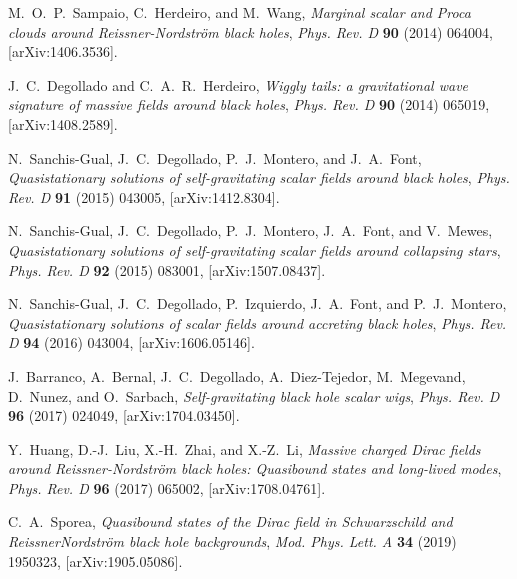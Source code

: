 \begin{thebibliography}{99}
M.~O.~P.~Sampaio, C.~Herdeiro, and M.~Wang,
\emph{Marginal scalar and Proca clouds around Reissner-Nordstr\"om black holes},
{\emph{Phys. Rev. D} {\bfseries 90} (2014) 064004},
[{{\ttfamily arXiv:1406.3536}}].

J.~C.~Degollado and C.~A.~R.~Herdeiro,
\emph{Wiggly tails: a gravitational wave signature of massive fields around black holes},
{\emph{Phys. Rev. D} {\bfseries 90} (2014) 065019},
[{{\ttfamily arXiv:1408.2589}}].


N.~Sanchis-Gual, J.~C.~Degollado, P.~J.~Montero, and J.~A.~Font,
\emph{Quasistationary solutions of self-gravitating scalar fields around black holes},
{\emph{Phys. Rev. D} {\bfseries 91} (2015) 043005},
[{{\ttfamily arXiv:1412.8304}}].

N.~Sanchis-Gual, J.~C.~Degollado, P.~J.~Montero, J.~A.~Font, and V.~Mewes,
\emph{Quasistationary solutions of self-gravitating scalar fields around collapsing stars},
{\emph{Phys. Rev. D} {\bfseries 92} (2015) 083001},
[{{\ttfamily arXiv:1507.08437}}].


N.~Sanchis-Gual, J.~C.~Degollado, P.~Izquierdo, J.~A.~Font, and P.~J.~Montero,
\emph{Quasistationary solutions of scalar fields around accreting black holes},
{\emph{Phys. Rev. D} {\bfseries 94} (2016) 043004},
[{{\ttfamily arXiv:1606.05146}}].

J.~Barranco, A.~Bernal, J.~C.~Degollado, A.~Diez-Tejedor, M.~Megevand, D.~Nunez, and O.~Sarbach,
\emph{Self-gravitating black hole scalar wigs},
{\emph{Phys. Rev. D} {\bfseries 96} (2017) 024049},
[{{\ttfamily arXiv:1704.03450}}].

Y.~Huang, D.-J.~Liu, X.-H.~Zhai, and X.-Z.~Li,
\emph{Massive charged Dirac fields around Reissner-Nordstr\"om black holes: Quasibound states and long-lived modes},
{\emph{Phys. Rev. D} {\bfseries 96} (2017) 065002},
[{{\ttfamily arXiv:1708.04761}}].

C.~A.~Sporea,
\emph{Quasibound states of the Dirac field in Schwarzschild and Reissner\textendash{}Nordstr\"om black hole backgrounds},
{\emph{Mod. Phys. Lett. A} {\bfseries 34} (2019) 1950323},
[{{\ttfamily arXiv:1905.05086}}].





\end{thebibliography}
